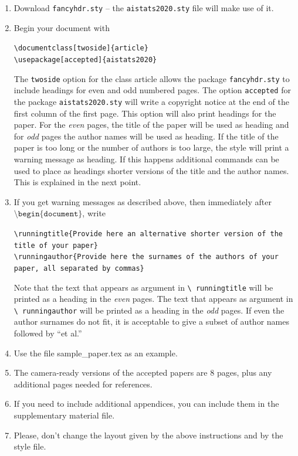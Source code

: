 \documentclass[twoside]{article}
\theoremstyle{plain}
\theoremstyle{definition}
\begin{document}
\begin{enumerate}
    \item Download \texttt{fancyhdr.sty} -- the
    \texttt{aistats2020.sty} file will make use of it.
    \item Begin your document with
    \begin{flushleft}
    \texttt{\textbackslash documentclass[twoside]\{article\}}\\
    \texttt{\textbackslash usepackage[accepted]\{aistats2020\}}
    \end{flushleft}
    The \texttt{twoside} option for the class article allows the
    package \texttt{fancyhdr.sty} to include headings for even and odd
    numbered pages. The option \texttt{accepted} for the package
    \texttt{aistats2020.sty} will write a copyright notice at the end of
    the first column of the first page. This option will also print
    headings for the paper.  For the \emph{even} pages, the title of
    the paper will be used as heading and for \emph{odd} pages the
    author names will be used as heading.  If the title of the paper
    is too long or the number of authors is too large, the style will
    print a warning message as heading. If this happens additional
    commands can be used to place as headings shorter versions of the
    title and the author names. This is explained in the next point.
    \item  If you get warning messages as described above, then
    immediately after $\texttt{\textbackslash
    begin\{document\}}$, write
    \begin{flushleft}
    \texttt{\textbackslash runningtitle\{Provide here an alternative
    shorter version of the title of your paper\}}\\
    \texttt{\textbackslash runningauthor\{Provide here the surnames of
    the authors of your paper, all separated by commas\}}
    \end{flushleft}
    Note that the text that appears as argument in \texttt{\textbackslash
      runningtitle} will be printed as a heading in the \emph{even}
    pages. The text that appears as argument in \texttt{\textbackslash
      runningauthor} will be printed as a heading in the \emph{odd}
    pages.  If even the author surnames do not fit, it is acceptable
    to give a subset of author names followed by ``et al.''

    \item Use the file sample\_paper.tex as an example.

    \item The camera-ready versions of the accepted papers are 8
      pages, plus any additional pages needed for references.

    \item If you need to include additional appendices,
      you can include them in the supplementary
      material file.

    \item Please, don't change the layout given by the above
      instructions and by the style file.

\end{enumerate}
\end{document}
